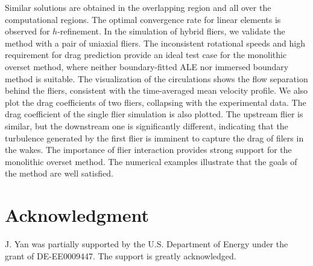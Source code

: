 \documentclass[preprint,12pt,sort&compress]{elsarticle}
\theoremstyle{definition}%
\begin{document}
Similar solutions are obtained in the overlapping region and all over the computational regions. The optimal convergence
rate for linear elements is observed for $h$-refinement. In the simulation of hybrid fliers, we validate the method with a pair
of uniaxial fliers. The inconsistent rotational speeds and high requirement for drag prediction provide an ideal test case for the 
monolithic overset method, where neither boundary-fitted ALE nor immersed boundary method is suitable. The visualization of the circulations
shows the flow separation behind the fliers, consistent with the time-averaged mean velocity profile. We also plot the drag coefficients
of two fliers, collapsing with the experimental data. The drag coefficient of the single flier simulation is also plotted. The upstream flier
is similar, but the downstream one is significantly different, indicating that the turbulence generated by the first flier is imminent to capture
the drag of filers in the wakes. The importance of flier interaction provides strong support for the monolithic overset method. The numerical
examples illustrate that the goals of the method are well satisfied.

\section*{Acknowledgment}\label{Ack}
J. Yan was partially supported by the U.S. Department of Energy under the grant of DE-EE0009447. The support is greatly acknowledged.
\newpage

%

\end{document}
